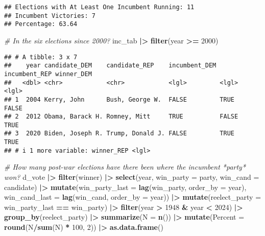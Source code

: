 \documentclass[
]{article}
\newenvironment{Shaded}{\begin{snugshade}}{\end{snugshade}}
\newcommand{\AttributeTok}[1]{\textcolor[rgb]{0.13,0.29,0.53}{#1}}
\newcommand{\CommentTok}[1]{\textcolor[rgb]{0.56,0.35,0.01}{\textit{#1}}}
\newcommand{\DecValTok}[1]{\textcolor[rgb]{0.00,0.00,0.81}{#1}}
\newcommand{\FunctionTok}[1]{\textcolor[rgb]{0.13,0.29,0.53}{\textbf{#1}}}
\newcommand{\NormalTok}[1]{#1}
\newcommand{\SpecialCharTok}[1]{\textcolor[rgb]{0.81,0.36,0.00}{\textbf{#1}}}
\begin{document}
\begin{verbatim}
## Elections with At Least One Incumbent Running: 11
## Incumbent Victories: 7
## Percentage: 63.64
\end{verbatim}

\begin{Shaded}
\begin{Highlighting}[]
\CommentTok{\# In the six elections since 2000?}
\NormalTok{inc\_tab }\SpecialCharTok{|\textgreater{}} 
  \FunctionTok{filter}\NormalTok{(year }\SpecialCharTok{\textgreater{}=} \DecValTok{2000}\NormalTok{)}
\end{Highlighting}
\end{Shaded}

\begin{verbatim}
## # A tibble: 3 x 7
##    year candidate_DEM    candidate_REP    incumbent_DEM incumbent_REP winner_DEM
##   <dbl> <chr>            <chr>            <lgl>         <lgl>         <lgl>     
## 1  2004 Kerry, John      Bush, George W.  FALSE         TRUE          FALSE     
## 2  2012 Obama, Barack H. Romney, Mitt     TRUE          FALSE         TRUE      
## 3  2020 Biden, Joseph R. Trump, Donald J. FALSE         TRUE          TRUE      
## # i 1 more variable: winner_REP <lgl>
\end{verbatim}

\begin{Shaded}
\begin{Highlighting}[]
\CommentTok{\# How many post{-}war elections have there been where the incumbent *party* won? }
\NormalTok{d\_vote }\SpecialCharTok{|\textgreater{}} 
  \FunctionTok{filter}\NormalTok{(winner) }\SpecialCharTok{|\textgreater{}} 
  \FunctionTok{select}\NormalTok{(year, }\AttributeTok{win\_party =}\NormalTok{ party, }\AttributeTok{win\_cand =}\NormalTok{ candidate) }\SpecialCharTok{|\textgreater{}} 
  \FunctionTok{mutate}\NormalTok{(}\AttributeTok{win\_party\_last =} \FunctionTok{lag}\NormalTok{(win\_party, }\AttributeTok{order\_by =}\NormalTok{ year),}
         \AttributeTok{win\_cand\_last =} \FunctionTok{lag}\NormalTok{(win\_cand, }\AttributeTok{order\_by =}\NormalTok{ year)) }\SpecialCharTok{|\textgreater{}} 
  \FunctionTok{mutate}\NormalTok{(}\AttributeTok{reelect\_party =}\NormalTok{ win\_party\_last }\SpecialCharTok{==}\NormalTok{ win\_party) }\SpecialCharTok{|\textgreater{}} 
  \FunctionTok{filter}\NormalTok{(year }\SpecialCharTok{\textgreater{}} \DecValTok{1948} \SpecialCharTok{\&}\NormalTok{ year }\SpecialCharTok{\textless{}} \DecValTok{2024}\NormalTok{) }\SpecialCharTok{|\textgreater{}} 
  \FunctionTok{group\_by}\NormalTok{(reelect\_party) }\SpecialCharTok{|\textgreater{}} 
  \FunctionTok{summarize}\NormalTok{(}\AttributeTok{N =} \FunctionTok{n}\NormalTok{()) }\SpecialCharTok{|\textgreater{}} 
  \FunctionTok{mutate}\NormalTok{(}\AttributeTok{Percent =} \FunctionTok{round}\NormalTok{(N}\SpecialCharTok{/}\FunctionTok{sum}\NormalTok{(N) }\SpecialCharTok{*} \DecValTok{100}\NormalTok{, }\DecValTok{2}\NormalTok{)) }\SpecialCharTok{|\textgreater{}}
  \FunctionTok{as.data.frame}\NormalTok{()}
\end{Highlighting}
\end{Shaded}
\end{document}
